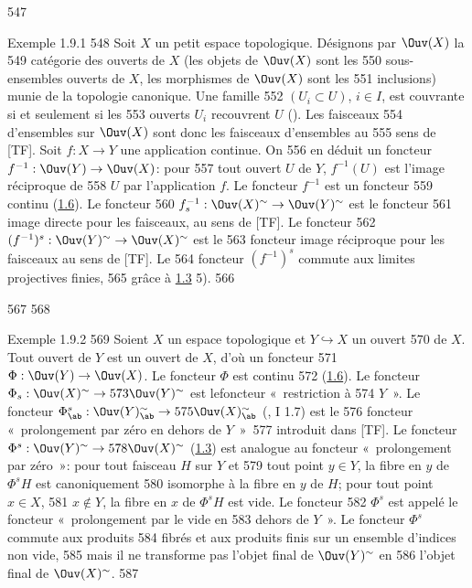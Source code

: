   547	\begin{enonce*}[remark]{Exemple 1.9.1}
   548	Soit $X$ un petit espace topologique. Désignons par $\Ouv(X)$ la
   549	catégorie des ouverts de $X$ (les objets de $\Ouv(X)$ sont les
   550	sous-ensembles ouverts de $X$, les morphismes de $\Ouv(X)$ sont les
   551	inclusions) munie de la topologie canonique. Une famille
   552	$(U_i\subset U)$, $i\in I$, est couvrante si et seulement si les
   553	ouverts $U_i$ recouvrent $U$ (). Les faisceaux
   554	d'ensembles sur $\Ouv(X)$ sont donc les faisceaux d'ensembles au
   555	sens de [TF]. Soit $f:X\rightarrow Y$ une application continue. On
   556	en déduit un foncteur $f^{-1}:\Ouv(Y)\rightarrow \Ouv(X)$: pour
   557	tout ouvert $U$ de $Y$, $f^{-1}(U)$ est l'image réciproque de
   558	$U$ par l'application $f$. Le foncteur $f^{-1}$ est un foncteur
   559	continu (\hyperref[III.prop1.6]{1.6}). Le foncteur
   560	$f^{-1}_s:\Ouv(X)^{\sim}\rightarrow \Ouv(Y)^{\sim}$ est le foncteur
   561	image directe pour les faisceaux, au sens de [TF]. Le foncteur
   562	$(f^{-1})^s:\Ouv(Y)^{\sim}\rightarrow \Ouv(X)^{\sim}$ est le
   563	foncteur image réciproque pour les faisceaux au sens de [TF]. Le
   564	foncteur $(f^{-1})^s$ commute aux limites projectives finies,
   565	grâce à \hyperref[III.prop1.3]{1.3} 5).
   566	\end{enonce*}
   567	
   568	\begin{enonce*}[remark]{Exemple 1.9.2}
   569	Soient $X$ un espace topologique et $Y\hookrightarrow X$ un ouvert
   570	de $X$. Tout ouvert de $Y$ est un ouvert de $X$, d'où un foncteur
   571	$\Phi:\Ouv(Y)\rightarrow \Ouv(X)$. Le foncteur $\Phi$ est continu
   572	(\hyperref[III.prop1.6]{1.6}). Le foncteur $\Phi_s:\Ouv(X)^{\sim}\rightarrow
   573	\Ouv(Y)^{\sim}$ est le\pageoriginale foncteur « restriction à
   574	$Y$ ». Le foncteur $\Phi^s_{\ab}:\Ouv(Y)^{\sim}_{\ab}\rightarrow
   575	\Ouv(X)^{\sim}_{\ab}$ (, I 1.7) est le
   576	foncteur « prolongement par zéro en dehors de $Y$ »\
   577	introduit dans [TF]. Le foncteur $\Phi^s:\Ouv(Y)^{\sim}\rightarrow
   578	\Ouv(X)^{\sim}$ (\hyperref[III.prop1.3]{1.3}) est analogue au foncteur « prolongement par zéro »: pour tout faisceau $H$ sur $Y$ et
   579	tout point $y\in Y$, la fibre en $y$ de $\Phi^sH$ est canoniquement
   580	isomorphe à la fibre en $y$ de $H$; pour tout point $x\in X$,
   581	$x\not\in Y$, la fibre en $x$ de $\Phi^sH$ est vide. Le foncteur
   582	$\Phi^s$ est appelé le foncteur « prolongement par le vide en
   583	dehors de $Y$ ». Le foncteur $\Phi^s$ commute aux produits
   584	fibrés et aux produits finis sur un ensemble d'indices non vide,
   585	mais il ne transforme pas l'objet final de $\Ouv(Y)^{\sim}$ en
   586	l'objet final de $\Ouv(X)^{\sim}$.
   587	\end{enonce*}
